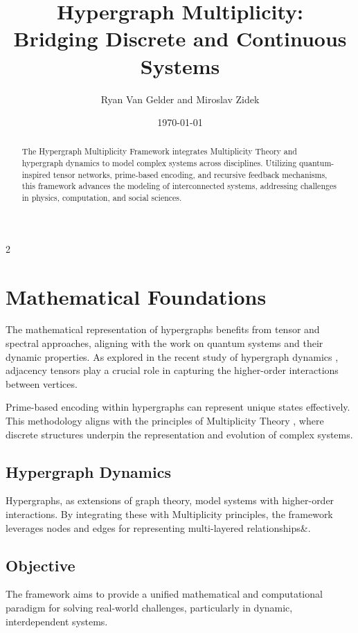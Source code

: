 \documentclass{article}
\theoremstyle{plain}
\begin{document}
\title{Hypergraph Multiplicity:\\Bridging Discrete and Continuous Systems}
\author{Ryan Van Gelder and Miroslav Zidek}
\date{\today}
\maketitle

\begin{abstract}
The Hypergraph Multiplicity Framework integrates Multiplicity Theory and hypergraph dynamics to model complex systems across disciplines. Utilizing quantum-inspired tensor networks, prime-based encoding, and recursive feedback mechanisms, this framework advances the modeling of interconnected systems, addressing challenges in physics, computation, and social sciences.
\end{abstract}

\begin{multicols}{2}
\begin{singlespace}
\tableofcontents
\end{singlespace}
\end{multicols}

\section{Mathematical Foundations}
The mathematical representation of hypergraphs benefits from tensor and spectral approaches, aligning with the work on quantum systems and their dynamic properties. As explored in the recent study of hypergraph dynamics \cite{hypergraph2021}, adjacency tensors play a crucial role in capturing the higher-order interactions between vertices.

Prime-based encoding within hypergraphs can represent unique states effectively. This methodology aligns with the principles of Multiplicity Theory \cite{vanGelder2024}, where discrete structures underpin the representation and evolution of complex systems.


\subsection{Hypergraph Dynamics}
Hypergraphs, as extensions of graph theory, model systems with higher-order interactions. By integrating these with Multiplicity principles, the framework leverages nodes and edges for representing multi-layered relationships&.

\subsection{Objective}
The framework aims to provide a unified mathematical and computational paradigm for solving real-world challenges, particularly in dynamic, interdependent systems.
\end{document}
